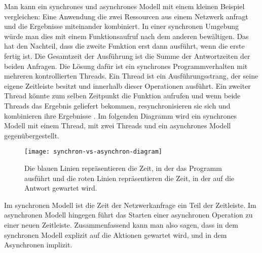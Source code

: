 \noindent
Man kann ein synchrones und asynchrones Modell mit einem kleinen Beispiel vergleichen: Eine Anwendung die zwei Ressourcen aus einem Netzwerk anfragt und die Ergebnisse miteinander kombiniert. In einer synchronen Umgebung würde man dies mit einem Funktionsaufruf nach dem anderen bewältigen. Das hat den Nachteil, dass die zweite Funktion erst dann ausführt, wenn die erste fertig ist. Die Gesamtzeit der Ausführung ist die Summe der Antwortzeiten der beiden Anfragen. Die Lösung dafür ist ein synchrones Programmverhalten mit mehreren kontrollierten Threads. Ein Thread ist ein Ausführungsstrang, der seine eigene Zeitleiste besitzt und innerhalb dieser Operationen ausführt. Ein zweiter Thread könnte zum selben Zeitpunkt die Funktion aufrufen und wenn beide Threads das Ergebnis geliefert bekommen, resynchronisieren sie sich und kombinieren ihre Ergebnisse \cite{asynchronitaet}. Im folgenden Diagramm wird ein synchrones Modell mit einem Thread, mit zwei Threads und ein asynchrones Modell gegenübergestellt.

\begin{center}
\begin{figure}[H]
\texttt{[image: synchron-vs-asynchron-diagram]}
\caption{Die blauen Linien repräsentieren die Zeit, in der das Programm ausführt und die roten Linien repräsentieren die Zeit, in der auf die Antwort gewartet wird.}
\end{figure}
\end{center}

\noindent
Im synchronen Modell ist die Zeit der Netzwerkanfrage ein Teil der Zeitleiste. Im asynchronen Modell hingegen führt das Starten einer asynchronen Operation zu einer neuen Zeitleiste. Zusammenfassend kann man also sagen, dass in dem synchronen Modell explizit auf die Aktionen gewartet wird, und in dem Asynchronen implizit.